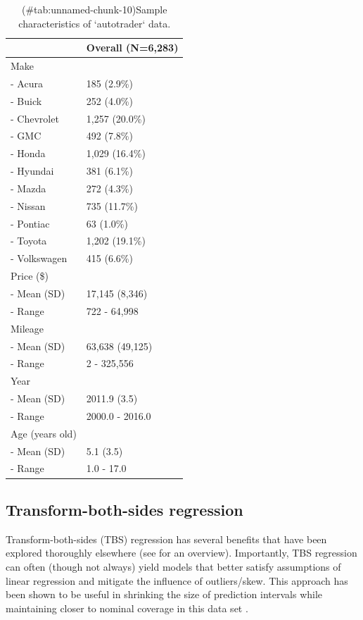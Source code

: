 \begin{Schunk}
\begin{table}

\caption{(\#tab:unnamed-chunk-10)Sample characteristics of `autotrader` data.}
\centering
\begin{tabular}[t]{ll}
\toprule
 & Overall (N=6,283)\\
\midrule
Make & \\
-  Acura & 185 (2.9\%)\\
-  Buick & 252 (4.0\%)\\
-  Chevrolet & 1,257 (20.0\%)\\
-  GMC & 492 (7.8\%)\\
-  Honda & 1,029 (16.4\%)\\
-  Hyundai & 381 (6.1\%)\\
-  Mazda & 272 (4.3\%)\\
-  Nissan & 735 (11.7\%)\\
-  Pontiac & 63 (1.0\%)\\
-  Toyota & 1,202 (19.1\%)\\
-  Volkswagen & 415 (6.6\%)\\
Price (\$) & \\
-  Mean (SD) & 17,145 (8,346)\\
-  Range & 722 - 64,998\\
Mileage & \\
-  Mean (SD) & 63,638 (49,125)\\
-  Range & 2 - 325,556\\
Year & \\
-  Mean (SD) & 2011.9 (3.5)\\
-  Range & 2000.0 - 2016.0\\
Age (years old) & \\
-  Mean (SD) & 5.1 (3.5)\\
-  Range & 1.0 - 17.0\\
\bottomrule
\end{tabular}
\end{table}

\end{Schunk}

\hypertarget{transform-both-sides-regression}{%
\subsection{Transform-both-sides
regression}\label{transform-both-sides-regression}}

Transform-both-sides (TBS) regression has several benefits that have
been explored thoroughly elsewhere (see \citet{harrell} for an
overview). Importantly, TBS regression can often (though not always)
yield models that better satisfy assumptions of linear regression and
mitigate the influence of outliers/skew. This approach has been shown to
be useful in shrinking the size of prediction intervals while
maintaining closer to nominal coverage in this data set
\citep{orq_paper}.

